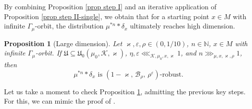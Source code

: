 \documentclass[11pt, leqno, fleqn]{amsart}
\def\cU{\mathfrak U}
\def\eps{\varepsilon}
\def\cB{          \mathcal B}
\newcommand{\SectionSymbol}{\textsection}
\def \N{{\mathbb N}}
\newcommand{\cK}{{\mathcal K}}
\newtheorem{prop}[thm]{\bf Proposition}
\theoremstyle{definition}
\theoremstyle{definition}
\begin{document}
By combining Proposition \ref{prop step I} and an iterative application of Proposition \ref{prop step II-single},  we obtain that for a starting point $x\in M$ with infinite $\Gamma_{\mu}$-orbit, the distribution $\mu^{*n}*\delta_{x}$ ultimately reaches high dimension.

   \begin{prop}[Large dimension] \label{prop step II}
   Let $\varkappa, \eps, \rho\in (0,1/10)$, $n\in \N$, $x\in M$ with infinite $\Gamma_{\mu}$-orbit. If $\cU\subseteq \cU_{0}(\mu_{0}, \cK, \varkappa)$, $\eta, \eps \lll_{\cK, \mu_{0}, x, \varkappa}1$, and $n \ggg_{\mu, x, \varkappa, \rho} 1$, then 
$$ \text{$\mu^{*n}*\delta_{x}$ is $(1-\varkappa, \,\cB_{\rho}, \,\rho^\eps)$-robust.}$$
  \end{prop} 

Let us take a moment to check Proposition \ref{prop step II}, admitting the previous key steps. For this, we can mimic the proof of \cite[\SectionSymbol 4.5]{BHZ}.
\end{document}
